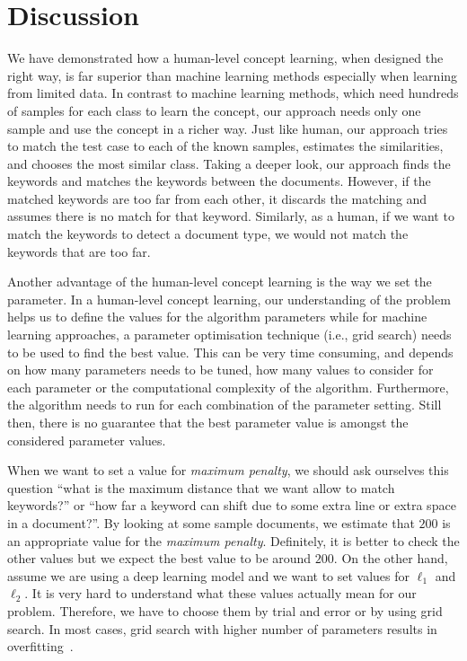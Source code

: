 \section{Discussion}\label{discuss}
We have demonstrated how a human-level concept learning, when designed the right way, is far superior than machine learning methods especially when learning from limited data. In contrast to machine learning methods, which need hundreds of samples for each class to learn the concept, our approach needs only one sample and use the concept in a richer way. Just like human, our approach tries to match the test case to each of the known samples, estimates the similarities, and chooses the most similar class. Taking a deeper look, our approach finds the keywords and matches the keywords between the documents. However, if the matched keywords are too far from each other, it discards the matching and assumes there is no match for that keyword. Similarly, as a human, if we want to match the keywords to detect a document type, we would not match the keywords that are too far.
 
Another advantage of the human-level concept learning is the way we set the parameter. In a human-level concept learning, our understanding of the problem helps us to define the values for the algorithm parameters while for machine learning approaches, a parameter optimisation technique (i.e., grid search) needs to be used to find the best value. This can be very time consuming, and depends on how many parameters needs to be tuned, how many values to consider for each parameter or the computational complexity of the algorithm. Furthermore, the algorithm needs to run for each combination of the parameter setting. Still then, there is no guarantee that the best parameter value is amongst the considered parameter values.

When we want to set a value for \textit{maximum penalty}, we should ask ourselves this question ``what is the maximum distance that we want allow to match keywords?'' or ``how far a keyword can shift due to some extra line or extra space in a document?''. By looking at some sample documents, we estimate that $200$ is an appropriate value for the \textit{maximum penalty}. Definitely, it is better to check the other values but we expect the best value to be around $200$. On the other hand, assume we are using a deep learning model and we want to set values for $\ell_1$ and $\ell_2$. It is very hard to understand what these values actually mean for our problem. Therefore, we have to choose them by trial and error or by using grid search. In most cases, grid search with higher number of parameters results in overfitting~\cite{cawley2010}.
 
